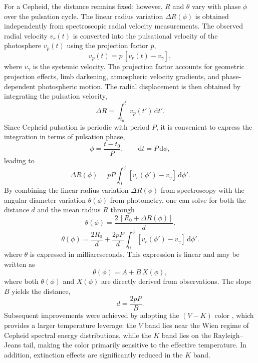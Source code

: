 
For a Cepheid, the distance remains fixed; however, $R$ and $\theta$ vary with phase $\phi$ over the pulsation cycle. The linear radius variation $\Delta R(\phi)$ is obtained independently from spectroscopic radial velocity measurements. The observed radial velocity $v_r(t)$ is converted into the pulsational velocity of the photosphere $v_p(t)$ using the projection factor $p$,
\begin{equation}
v_p(t) = p \,[v_r(t) - v_\gamma],
\end{equation}
where $v_\gamma$ is the systemic velocity. The projection factor accounts for geometric projection effects, limb darkening, atmospheric velocity gradients, and phase-dependent photospheric motion. The radial displacement is then obtained by integrating the pulsation velocity,
\begin{equation}
\Delta R = \int_{t_0}^{t} v_p(t')\,\mathrm{d}t' .
\end{equation}
Since Cepheid pulsation is periodic with period $P$, it is convenient to express the integration in terms of pulsation phase,
\begin{equation}
\phi = \frac{t - t_0}{P}, \qquad \mathrm{d}t = P\,\mathrm{d}\phi ,
\end{equation}
leading to
\begin{equation}
\Delta R(\phi) = p P \int_{0}^{\phi} [v_r(\phi') - v_\gamma]\,\mathrm{d}\phi' .
\end{equation}
By combining the linear radius variation $\Delta R(\phi)$ from spectroscopy with the angular diameter variation $\theta(\phi)$ from photometry, one can solve for both the distance $d$ and the mean radius $R$ through
\begin{equation}
\theta(\phi) = \frac{2\,[R_0 + \Delta R(\phi)]}{d}.
\end{equation}
\begin{equation}
\theta(\phi) = \frac{2 R_0}{d} + \frac{2 p P}{d}
\int_{0}^{\phi} [v_r(\phi') - v_\gamma]\,\mathrm{d}\phi' .
\end{equation}
where $\theta$ is expressed in milliarcseconds. This expression is linear and may be written as
\begin{equation}
\theta(\phi) = A + B\,X(\phi),
\end{equation}
where both $\theta(\phi)$ and $X(\phi)$ are directly derived from observations. The slope $B$ yields the distance,
\begin{equation}
d = \frac{2 p P}{B}.
\end{equation}
Subsequent improvements were achieved by adopting the $(V-K)$ color \citep{1994Welch}, which provides a larger temperature leverage: the $V$ band lies near the Wien regime of Cepheid spectral energy distributions, while the $K$ band lies on the Rayleigh--Jeans tail, making the color primarily sensitive to the effective temperature. In addition, extinction effects are significantly reduced in the $K$ band.

